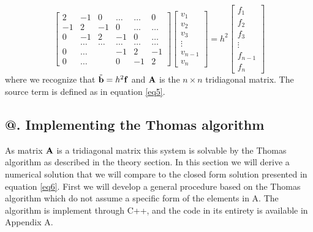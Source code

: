 \documentclass[%
reprint,
amsmath,amssymb,
aps,
]{revtex4-1}
\makeatletter
\newcommand*{\rom}[1]{\expandafter\@slowromancap\romannumeral #1@}
\makeatother
\begin{document}
\begin{equation*}
\begin{bmatrix}
2 & -1 & 0 & \dots  & \dots & 0 \\
-1 & 2 & -1 & 0 & \dots & \dots \\
0 & -1 & 2 & -1 & 0 & \dots \\
& \dots & \dots & \dots & \dots & \dots \\
0 & \dots &  & -1 & 2 & -1 \\
0 & \dots &  & 0 & -1 & 2
\end{bmatrix}
\begin{bmatrix}
v_1 \\ 
v_2 \\
v_3 \\  
\vdots \\
v_{n-1} \\ 
v_{n}
\end{bmatrix}
= h^2	
\begin{bmatrix}
f_1 \\
f_2 \\ 
f_3 \\ 
\vdots \\
f_{n-1} \\ 
f_n
\end{bmatrix} 
\end{equation*} 
where we recognize that $\tilde{\mathbf{b}} = h^2\bf{f}$ and $\bf{A}$ is the  $n \times n$ tridiagonal matrix. The source term is defined as in equation \ref{eq5}.

\subsection*{\rom{2}. Implementing the Thomas algorithm}
\noindent As matrix $\bf{A}$ is a tridiagonal matrix
this system is solvable by the Thomas algorithm as described in the theory section. In this section we will derive a numerical solution that we will compare to the closed form solution presented in equation \ref{eq6}.  First we will develop a general procedure based on the Thomas algorithm which do not assume a specific form of the elements in A. The algorithm is implement through C++, and the code in its entirety is available in Appendix A. 
\end{document}
